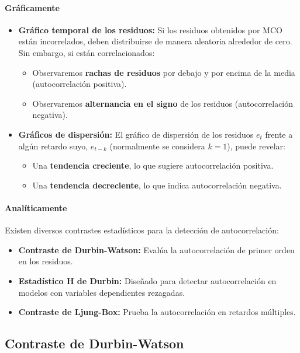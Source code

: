 \documentclass[a4paper,12pt]{article}
\begin{document}
\paragraph{Gráficamente}
\begin{itemize}
    \item \textbf{Gráfico temporal de los residuos:}  
    Si los residuos obtenidos por MCO están incorrelados, deben distribuirse de manera aleatoria alrededor de cero. Sin embargo, si están correlacionados:
    \begin{itemize}
        \item Observaremos \textbf{rachas de residuos} por debajo y por encima de la media (autocorrelación positiva).
        \item Observaremos \textbf{alternancia en el signo} de los residuos (autocorrelación negativa).
    \end{itemize}
    
    \item \textbf{Gráficos de dispersión:}  
    El gráfico de dispersión de los residuos $e_t$ frente a algún retardo suyo, $e_{t-k}$ (normalmente se considera $k=1$), puede revelar:
    \begin{itemize}
        \item Una \textbf{tendencia creciente}, lo que sugiere autocorrelación positiva.
        \item Una \textbf{tendencia decreciente}, lo que indica autocorrelación negativa.
    \end{itemize}
\end{itemize}

\paragraph{Analíticamente}
Existen diversos contrastes estadísticos para la detección de autocorrelación:
\begin{itemize}
    \item \textbf{Contraste de Durbin-Watson:} Evalúa la autocorrelación de primer orden en los residuos.
    \item \textbf{Estadístico H de Durbin:} Diseñado para detectar autocorrelación en modelos con variables dependientes rezagadas.
    \item \textbf{Contraste de Ljung-Box:} Prueba la autocorrelación en retardos múltiples.
\end{itemize}

\subsection{Contraste de Durbin-Watson}
\end{document}
